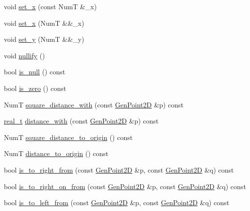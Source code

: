 \begin{DoxyCompactItemize}
void \hyperlink{class_designar_1_1_gen_point2_d_a73d4687bde9246ae64deff4e832acb24}{set\+\_\+x} (const NumT \&\+\_\+x)
\item 
void \hyperlink{class_designar_1_1_gen_point2_d_a584f53cd613dd3401c22e0f4b029d2a9}{set\+\_\+x} (NumT \&\&\+\_\+x)
\item 
void \hyperlink{class_designar_1_1_gen_point2_d_af82a367767d79081e2afe1228fcf2bc6}{set\+\_\+y} (NumT \&\&\+\_\+y)
\item 
void \hyperlink{class_designar_1_1_gen_point2_d_a256d6fda1a250b7a664b76b7c8f914d7}{nullify} ()
\item 
bool \hyperlink{class_designar_1_1_gen_point2_d_aa6c5b4c078b46565646f1bd93dae5bf4}{is\+\_\+null} () const
\item 
bool \hyperlink{class_designar_1_1_gen_point2_d_a75d3dd925cc99701000be4cc0c6967fd}{is\+\_\+zero} () const
\item 
NumT \hyperlink{class_designar_1_1_gen_point2_d_a4c9122867f6fd19991e146e745346075}{square\+\_\+distance\+\_\+with} (const \hyperlink{class_designar_1_1_gen_point2_d}{Gen\+Point2D} \&p) const
\item 
\hyperlink{namespace_designar_aca2c32af26808dbec1f3a3071fad25ce}{real\+\_\+t} \hyperlink{class_designar_1_1_gen_point2_d_a4e7b6cad160caef4b1f5ab8f2b1ad0da}{distance\+\_\+with} (const \hyperlink{class_designar_1_1_gen_point2_d}{Gen\+Point2D} \&p) const
\item 
NumT \hyperlink{class_designar_1_1_gen_point2_d_adda120357e8a76bd42b7cd9517cecaad}{square\+\_\+distance\+\_\+to\+\_\+origin} () const
\item 
NumT \hyperlink{class_designar_1_1_gen_point2_d_a91bb9e8b5022b06a407ebdda4dabb220}{distance\+\_\+to\+\_\+origin} () const
\item 
bool \hyperlink{class_designar_1_1_gen_point2_d_acb12e43d036b0a5719af3887814a2684}{is\+\_\+to\+\_\+right\+\_\+from} (const \hyperlink{class_designar_1_1_gen_point2_d}{Gen\+Point2D} \&p, const \hyperlink{class_designar_1_1_gen_point2_d}{Gen\+Point2D} \&q) const
\item 
bool \hyperlink{class_designar_1_1_gen_point2_d_ac8980c31c7c8075510e3e74f4358b305}{is\+\_\+to\+\_\+right\+\_\+on\+\_\+from} (const \hyperlink{class_designar_1_1_gen_point2_d}{Gen\+Point2D} \&p, const \hyperlink{class_designar_1_1_gen_point2_d}{Gen\+Point2D} \&q) const
\item 
bool \hyperlink{class_designar_1_1_gen_point2_d_a1313b28156494163cdbf421e4cfc264e}{is\+\_\+to\+\_\+left\+\_\+from} (const \hyperlink{class_designar_1_1_gen_point2_d}{Gen\+Point2D} \&p, const \hyperlink{class_designar_1_1_gen_point2_d}{Gen\+Point2D} \&q) const

\end{DoxyCompactItemize}
